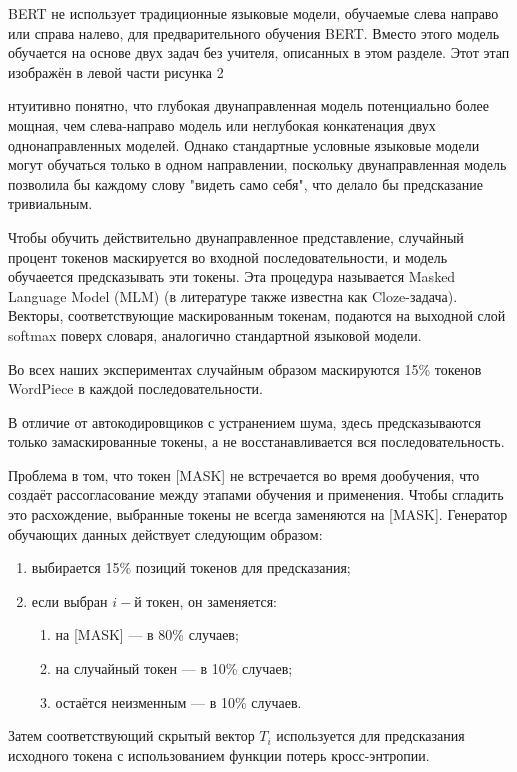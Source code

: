 BERT не использует традиционные языковые модели, обучаемые слева направо или справа налево, для предварительного обучения BERT. Вместо этого модель обучается  на основе двух задач без учителя, описанных в этом разделе. Этот этап изображён в левой части рисунка 2

нтуитивно понятно, что глубокая двунаправленная модель потенциально более мощная, чем слева-направо модель или неглубокая конкатенация двух однонаправленных моделей. Однако стандартные условные языковые модели могут обучаться только в одном направлении, поскольку двунаправленная модель позволила бы каждому слову "видеть само себя", что делало бы предсказание тривиальным.

Чтобы обучить действительно двунаправленное представление, случайный процент токенов  маскируется во входной последовательности, и модель обучаеется  предсказывать эти токены. Эта  процедура называется  Masked Language Model (MLM) (в литературе также известна как Cloze-задача). Векторы, соответствующие маскированным токенам, подаются на выходной слой softmax поверх словаря, аналогично стандартной языковой модели.

Во всех наших экспериментах  случайным образом маскируются 15\% токенов WordPiece в каждой последовательности.

В отличие от автокодировщиков с устранением шума, здесь  предсказываются только замаскированные токены, а не восстанавливается вся последовательность.

Проблема в том, что токен [MASK] не встречается во время дообучения, что создаёт рассогласование между этапами обучения и применения. Чтобы сгладить это расхождение, выбранные токены  не всегда заменяются на [MASK]. Генератор обучающих данных действует следующим образом:

\begin{enumerate}[label=\arabic*.]
\item выбирается 15\% позиций токенов для предсказания;

\item если выбран $i-й$ токен, он заменяется:
\begin{enumerate}[label=\arabic*.]
\item на [MASK] — в 80\% случаев;
\item на случайный токен — в 10\% случаев;
\item остаётся неизменным — в 10\% случаев.
\end{enumerate}

\end{enumerate}
Затем соответствующий скрытый вектор $T_i$ используется для предсказания исходного токена с использованием функции потерь кросс-энтропии.

